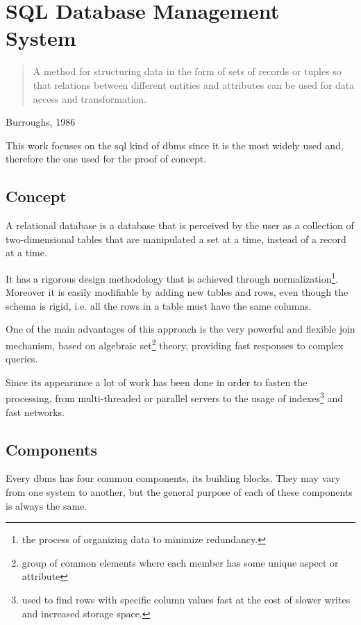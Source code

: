 

\section{SQL Database Management System}
\label{sec:rdbms}

\begin{quote}
	A method for structuring data in the form of sets of records or tuples so that relations between different entities and attributes can be used for data access and transformation. 
\end{quote} 
\begin{flushright}Burroughs, 1986\end{flushright}
	
This work focuses on the \ac{sql} kind of \ac{dbms} since it is the most widely used and, therefore the one used for the proof of concept.

\subsection{Concept}
A relational database is a database that is perceived by the user as a collection of two-dimensional tables that are manipulated a set at a time, instead of a record at a time.  

It has a rigorous design methodology that is achieved through normalization\footnote{ the process of organizing data to minimize redundancy.}. Moreover it is easily modifiable by adding new tables and rows, even though the schema is rigid, i.e. all the rows in a table must have the same columns. 

One of the main advantages of this approach is the very powerful and flexible join mechanism, based on algebraic set\footnote{ group of common elements where each member has some unique aspect or attribute} theory, providing fast responses to complex queries.

Since its appearance a lot of work has been done in order to fasten the processing, from multi-threaded or parallel servers to the usage of indexes\footnote{ used to find rows with specific column values fast at the cost of slower writes and increased storage space.} and fast networks. 

\subsection{Components}
Every \ac{dbms}  has four common components, its building blocks. They may vary from one system to another, but the general purpose of each of these components is always the same.

